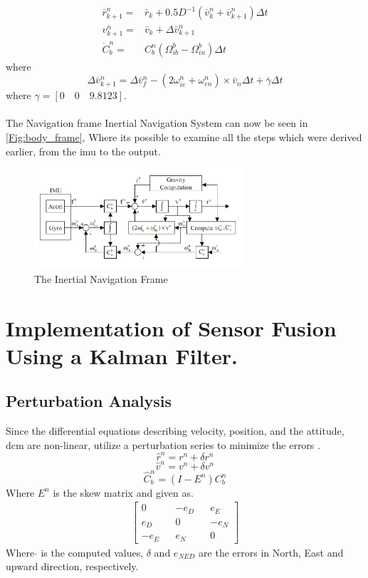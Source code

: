 \begin{align}
\bar{r}_{k+1}^n = & \bar{r}_k + 0.5D^{-1}(\bar{v}_k^n + \bar{v}_{k+1}^n)\Delta t
\label{Eq.r_n_d}\\
v_{k+1}^n= & \bar{v}_k + \Delta \bar{v}_{k+1}^n
\label{Eq.v_n_d}\\
\dot{C}_b^n = & C_b^n(\Omega_{ib}^b - \Omega_{in}^b)\Delta t
\label{Eq.C_b_n_d}
\end{align}
where 
\begin{equation}
\Delta \bar{v}_{k+1}^n = \Delta \bar{v}_f^n - (2\omega_{ie}^n+\omega_{en}^n) \times \bar{v}_n \Delta t +\bar{\gamma}\Delta t
\end{equation}
where $\gamma = [0 \quad 0 \quad 9.8123]$.\\ \\
The Navigation frame Inertial Navigation System can now be seen in \autoref{Fig:body_frame}, Where its possible to examine all the steps which were derived earlier, from the \gls{imu} to the output.
\begin{figure}[H]
\centering
\includegraphics[width=0.7\textwidth]{Figures/ins_2}
\caption{The Inertial Navigation Frame}
\label{Fig:body_frame}
\end{figure}
\section{Implementation of Sensor Fusion Using a Kalman Filter.}
\subsection*{Perturbation Analysis}
Since the differential equations describing velocity, position, and the attitude, \gls{dcm} are non-linear, utilize a perturbation series to minimize the errors \cite{pertubation}.
\begin{equation}
\hat{r}^n =r^n+\delta r^n
\label{Eq.per_r}
\end{equation}
\begin{equation}
\hat{v}^n =v^n+\delta v^n
\label{Eq.per_v}
\end{equation}
\begin{equation}
\hat{C}_b^n = (I-E^n)C_b^n
\label{Eq.per_c}
\end{equation}
Where $E^n$ is the skew matrix and given as.
\begin{align}
\begin{bmatrix} 
0 && -e_D && e_E \\
e_D && 0 && -e_N \\
-e_E && e_N && 0
\end{bmatrix}
\end{align}
Where $\hat{}$ is the computed values, $\delta$ and $e_{NED}$ are the errors in North, East and upward direction, respectively.

